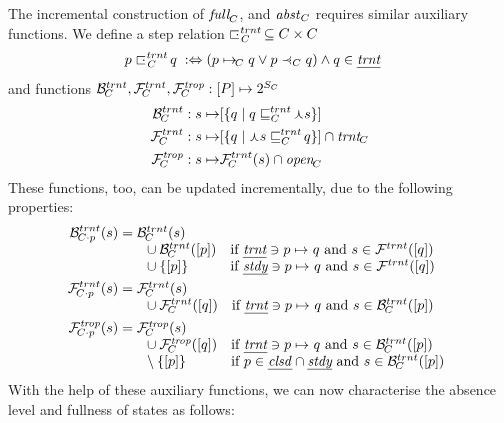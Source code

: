 \documentclass{article}
\begin{document}
%
The incremental construction of $\Full[C]$, and $\Absent[C]$ requires similar auxiliary functions. We define a step relation ${\transientstep[C]}\subseteq C\times C$
%
\begin{align*}
p \transientstep[C] q \;\iffdef\; & (p\stepany[C] q \vee p\gostep[C] q) \wedge q\in\pTransient
\end{align*}
%
and functions $\BackTrans[C],\ForwTrans[C],\ForwTrOp[C]:[P]\mapsto 2^{S_C}$
%
\begin{align*}
\BackTrans[C] : s\mapsto & \stat{\gensetof{q}{q\transienttoeq[C] \prm s}} \\
\ForwTrans[C] : s\mapsto & \stat{\gensetof{q}{\prm s\transienttoeq[C] q}}\cap \Transient[C] \\
\ForwTrOp[C] : s\mapsto & \ForwTrans[C](s) \cap \Open[C]
\end{align*}
%
These functions, too, can be updated incrementally, due to the following properties:
%
\begin{align*}
\BackTrans[\addp Cp](s) = {}
 & \begin{array}[t]{@{}ll}
 	\BackTrans[C](s) \\
 	{\enspace} \cup \BackTrans[C]([p]) & \text{if } \pTransient\ni p\stepany q \text{ and } s\in \ForwTrans([q]) \\
 	{\enspace} \cup \setof{[p]} & \text{if } \pSteady\ni p\stepany q \text{ and } s\in \ForwTrans([q])
 \end{array} \\
\ForwTrans[\addp Cp](s) = {}
 & \begin{array}[t]{@{}ll}
   \ForwTrans[C](s) \\
   {\enspace} \cup \ForwTrans[C]([q]) & \text{if } \pTransient\ni p\stepany q \text{ and } s\in \BackTrans[C](\stat p)
   \end{array} \\
\ForwTrOp[\addp Cp](s) = {}
& \begin{array}[t]{@{}ll}
	\ForwTrOp[C](s) \\
	{\enspace} \cup \ForwTrOp[C]([q]) & \text{if } \pTransient\ni p\stepany q \text{ and } s\in \BackTrans[C](\stat p) \\
	{\enspace} \setminus \setof{\stat p} & \text{if } p\in \pClosed \cap \pSteady \text{ and } s\in \BackTrans[C](\stat p)
\end{array} 
\end{align*}
%
With the help of these auxiliary functions, we can now characterise the absence level and fullness of states as follows:
%
\end{document}
